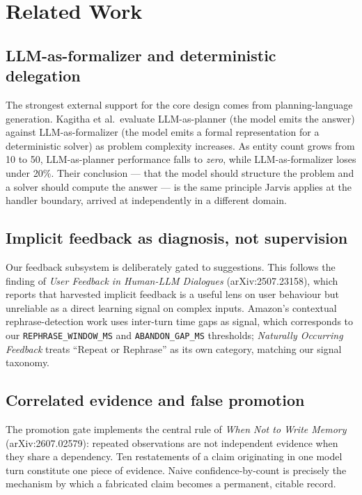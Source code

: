 \documentclass[10pt,twocolumn]{article}
\newcommand{\code}[1]{\texttt{\small #1}}
\begin{document}
\section{Related Work}
\label{sec:related}

\subsection{LLM-as-formalizer and deterministic delegation}

The strongest external support for the core design comes from planning-language
generation. Kagitha et al.\ evaluate LLM-as-planner (the model emits the answer) against
LLM-as-formalizer (the model emits a formal representation for a deterministic solver)
as problem complexity increases. As entity count grows from 10 to 50, LLM-as-planner
performance falls to \emph{zero}, while LLM-as-formalizer loses under 20\%. Their
conclusion --- that the model should structure the problem and a solver should compute
the answer --- is the same principle Jarvis applies at the handler boundary, arrived at
independently in a different domain.

\subsection{Implicit feedback as diagnosis, not supervision}

Our feedback subsystem is deliberately gated to suggestions. This follows the finding of
\emph{User Feedback in Human-LLM Dialogues} (arXiv:2507.23158), which reports that
harvested implicit feedback is a useful lens on user behaviour but unreliable as a
direct learning signal on complex inputs. Amazon's contextual rephrase-detection work
uses inter-turn time gaps as signal, which corresponds to our \code{REPHRASE\_WINDOW\_MS}
and \code{ABANDON\_GAP\_MS} thresholds; \emph{Naturally Occurring Feedback} treats
``Repeat or Rephrase'' as its own category, matching our signal taxonomy.

\subsection{Correlated evidence and false promotion}

The promotion gate implements the central rule of \emph{When Not to Write Memory}
(arXiv:2607.02579): repeated observations are not independent evidence when they share a
dependency. Ten restatements of a claim originating in one model turn constitute one
piece of evidence. Naive confidence-by-count is precisely the mechanism by which a
fabricated claim becomes a permanent, citable record.
\end{document}
